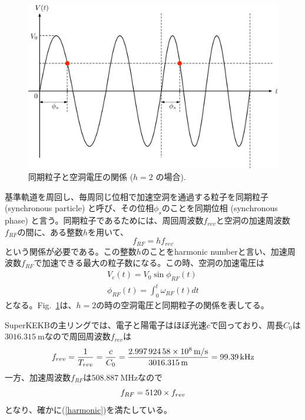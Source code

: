\documentclass[]{jlreq}
\begin{document}
\begin{figure}[hbt]
  \begin{center}
    \includegraphics[width=15cm,clip]{figs/synchronous.pdf}
    \caption{同期粒子と空洞電圧の関係 ($h=2$ の場合).}
    \label{synchronous}
  \end{center}
\end{figure}

基準軌道を周回し、毎周同じ位相で加速空洞を通過する粒子を同期粒子 (synchronous particle) と呼び、その位相$\phi_s$のことを同期位相 (synchronous phase) と言う。同期粒子であるためには、周回周波数$f_{rev}$と空洞の加速周波数$f_{RF}$の間に、ある整数$h$を用いて、
%
\begin{equation}
  f_{RF} = h f_{rev}
  \label{harmonic}
\end{equation}
%
という関係が必要である。この整数$h$のことをharmonic numberと言い、加速周波数$f_{RF}$で加速できる最大の粒子数になる。この時、空洞の加速電圧は
%
\begin{equation}
  \begin{split}
    V_c (t) = V_0 \sin \phi_{RF}(t) \\
    \phi_{RF}(t) = \int_0^t \omega_{RF}(t) dt
  \end{split}
\end{equation}
%
となる。Fig.~\ref{synchronous}は、$h=2$の時の空洞電圧と同期粒子の関係を表してる。

\vspace{\baselineskip}

\begin{tcolorbox}[title=\textgt{SuperKEKBにおける$f_{RF}$, $f_{0}$, $h$}の関係]
  SuperKEKBの主リングでは、電子と陽電子はほぼ光速$c$で回っており、周長$C_0$は$\SI{3016.315}{\meter}$なので周回周波数$f_{rev}$は
  \begin{equation}
    f_{rev} = \frac{1}{T_{rev}}=\frac{c}{C_0}=\frac{\SI{2.99792458e8}{\meter / \second}}{\SI{3016.315}{\meter}}=\SI{99.39}{\kilo\hertz} \notag
  \end{equation}
  一方、加速周波数$f_{RF}$は$\SI{508.887}{\mega\hertz}$なので
  \begin{equation}
      f_{RF} = 5120 \times f_{rev} \notag
  \end{equation}
  となり、確かに(\ref{harmonic})を満たしている。
\end{tcolorbox}
\end{document}
